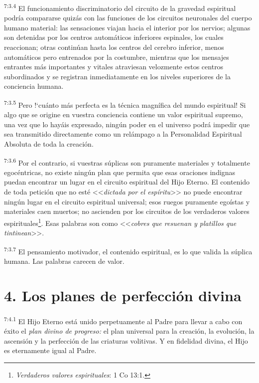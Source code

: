 \par
\textsuperscript{7:3.4} El funcionamiento discriminatorio del circuito de la gravedad espiritual podría compararse quizás con las funciones de los circuitos neuronales del cuerpo humano material: las sensaciones viajan hacia el interior por los nervios; algunas son detenidas por los centros automáticos inferiores espinales, los cuales reaccionan; otras continúan hasta los centros del cerebro inferior, menos automáticos pero entrenados por la costumbre, mientras que los mensajes entrantes más importantes y vitales atraviesan velozmente estos centros subordinados y se registran inmediatamente en los niveles superiores de la conciencia humana.

\par
\textsuperscript{7:3.5} Pero !`cuánto más perfecta es la técnica magnífica del mundo espiritual! Si algo que se origine en vuestra conciencia contiene un valor espiritual supremo, una vez que lo hayáis expresado, ningún poder en el universo podrá impedir que sea transmitido directamente como un relámpago a la Personalidad Espiritual Absoluta de toda la creación.

\par
\textsuperscript{7:3.6} Por el contrario, si vuestras súplicas son puramente materiales y totalmente egocéntricas, no existe ningún plan que permita que esas oraciones indignas puedan encontrar un lugar en el circuito espiritual del Hijo Eterno. El contenido de toda petición que no esté <<\textit{dictada por el espíritu}>> no puede encontrar ningún lugar en el circuito espiritual universal; esos ruegos puramente egoístas y materiales caen muertos; no ascienden por los circuitos de los verdaderos valores espirituales\footnote{\textit{Verdaderos valores espirituales}: 1 Co 13:1.}. Esas palabras son como <<\textit{cobres que resuenan y platillos que tintinean}>>.

\par
\textsuperscript{7:3.7} El pensamiento motivador, el contenido espiritual, es lo que valida la súplica humana. Las palabras carecen de valor.

\section*{4. Los planes de perfección divina}
\par
\textsuperscript{7:4.1} El Hijo Eterno está unido perpetuamente al Padre para llevar a cabo con éxito el \textit{plan divino de progreso:} el plan universal para la creación, la evolución, la ascensión y la perfección de las criaturas volitivas. Y en fidelidad divina, el Hijo es eternamente igual al Padre.

